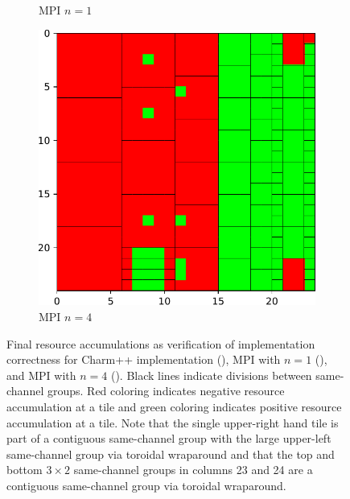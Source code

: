 \begin{figure}
\begin{subfigure}[b]{0.33\textwidth}
\caption{
MPI $n=1$
}
\label{fig:mpi_n1_correctness}
\end{subfigure}%
\begin{subfigure}[b]{0.33\textwidth}
  \includegraphics[width=\textwidth]{img/MPI-n4-correctness}
\caption{
MPI $n=4$
}
\label{fig:mpi_n4_correctness}
\end{subfigure}
\caption{
Final resource accumulations as verification of implementation correctness for Charm++ implementation (), MPI with $n=1$ (), and MPI with $n=4$ ().
Black lines indicate divisions between same-channel groups.
Red coloring indicates negative resource accumulation at a tile and green coloring indicates positive resource accumulation at a tile.
Note that the single upper-right hand tile is part of a contiguous same-channel group with the large upper-left same-channel group via toroidal wraparound and that the top and bottom $3 \times 2$ same-channel groups in columns 23 and 24 are a contiguous same-channel group via toroidal wraparound.
}
\label{fig:correctness}
\end{figure}
